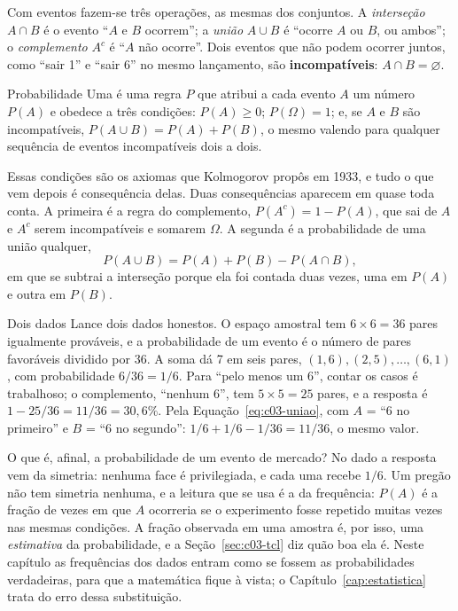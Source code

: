 Com eventos fazem-se três operações, as mesmas dos conjuntos. A \emph{interseção} $A \cap B$ é o evento ``$A$ e $B$ ocorrem''; a \emph{união} $A \cup B$ é ``ocorre $A$ ou $B$, ou ambos''; o \emph{complemento} $A^c$ é ``$A$ não ocorre''. Dois eventos que não podem ocorrer juntos, como ``sair 1'' e ``sair 6'' no mesmo lançamento, são \textbf{incompatíveis}: $A \cap B = \varnothing$.

\begin{definicao}{Probabilidade}
Uma  é uma regra $P$ que atribui a cada evento $A$ um número $P(A)$ e obedece a três condições: $P(A) \ge 0$; $P(\Omega) = 1$; e, se $A$ e $B$ são incompatíveis, $P(A \cup B) = P(A) + P(B)$, o mesmo valendo para qualquer sequência de eventos incompatíveis dois a dois.
\end{definicao}

Essas condições são os axiomas que Kolmogorov propôs em 1933, e tudo o que vem depois é consequência delas. Duas consequências aparecem em quase toda conta. A primeira é a regra do complemento, $P(A^c) = 1 - P(A)$, que sai de $A$ e $A^c$ serem incompatíveis e somarem $\Omega$. A segunda é a probabilidade de uma união qualquer,
\begin{equation}
  P(A \cup B) = P(A) + P(B) - P(A \cap B) ,
  \label{eq:c03-uniao}
\end{equation}
em que se subtrai a interseção porque ela foi contada duas vezes, uma em $P(A)$ e outra em $P(B)$.

\begin{exemplo}{Dois dados}
Lance dois dados honestos. O espaço amostral tem $6 \times 6 = 36$ pares igualmente prováveis, e a probabilidade de um evento é o número de pares favoráveis dividido por 36. A soma dá 7 em seis pares, $(1,6), (2,5), \dots, (6,1)$, com probabilidade $6/36 = 1/6$. Para ``pelo menos um 6'', contar os casos é trabalhoso; o complemento, ``nenhum 6'', tem $5 \times 5 = 25$ pares, e a resposta é $1 - 25/36 = 11/36 = 30,6\%$. Pela Equação~\eqref{eq:c03-uniao}, com $A$ = ``6 no primeiro'' e $B$ = ``6 no segundo'': $1/6 + 1/6 - 1/36 = 11/36$, o mesmo valor.
\end{exemplo}

O que é, afinal, a probabilidade de um evento de mercado? No dado a resposta vem da simetria: nenhuma face é privilegiada, e cada uma recebe $1/6$. Um pregão não tem simetria nenhuma, e a leitura que se usa é a da frequência: $P(A)$ é a fração de vezes em que $A$ ocorreria se o experimento fosse repetido muitas vezes nas mesmas condições. A fração observada em uma amostra é, por isso, uma \emph{estimativa} da probabilidade, e a Seção~\ref{sec:c03-tcl} diz quão boa ela é. Neste capítulo as frequências dos dados entram como se fossem as probabilidades verdadeiras, para que a matemática fique à vista; o Capítulo~\ref{cap:estatistica} trata do erro dessa substituição.

